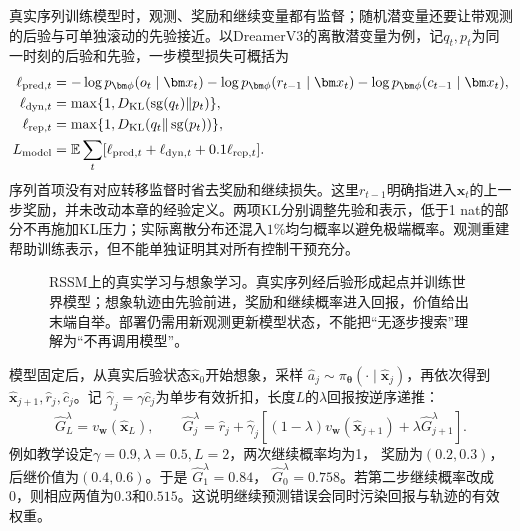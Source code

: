 真实序列训练模型时，观测、奖励和继续变量都有监督；随机潜变量还要让带观测的后验与可单独滚动的先验接近。以DreamerV3的离散潜变量为例，记$q_t,p_t$为同一时刻的后验和先验，一步模型损失可概括为
\begin{align}
 \ell_{\mathrm{pred},t}
   &=-\log p_{\bm\phi}(o_t\mid\bm x_t)
     -\log p_{\bm\phi}(r_{t-1}\mid\bm x_t)
     -\log p_{\bm\phi}(c_{t-1}\mid\bm x_t),\notag\\
 \ell_{\mathrm{dyn},t}
   &=\max\{1,D_{\mathrm{KL}}(\operatorname{sg}(q_t)\|p_t)\},\notag\\
 \ell_{\mathrm{rep},t}
   &=\max\{1,D_{\mathrm{KL}}(q_t\|\operatorname{sg}(p_t))\},\notag\\
 L_{\mathrm{model}}&=\mathbb E\sum_t
       [\ell_{\mathrm{pred},t}+\ell_{\mathrm{dyn},t}
                         +0.1\ell_{\mathrm{rep},t}].
 \label{eq:rl-learning-dreamer-model}
\end{align}
序列首项没有对应转移监督时省去奖励和继续损失。这里$r_{t-1}$明确指进入$\bm x_t$的上一步奖励，并未改动本章的经验定义。两项KL分别调整先验和表示，低于1 nat的部分不再施加KL压力；实际离散分布还混入$1\%$均匀概率以避免极端概率。观测重建帮助训练表示，但不能单独证明其对所有控制干预充分。

\begin{figure}[t]
  \centering
  
  \caption{RSSM上的真实学习与想象学习。真实序列经后验形成起点并训练世界模型；想象轨迹由先验前进，奖励和继续概率进入回报，价值给出末端自举。部署仍需用新观测更新模型状态，不能把“无逐步搜索”理解为“不再调用模型”。}
  \label{fig:rl-learning-dreamer}
\end{figure}

模型固定后，从真实后验状态$\widehat{\bm x}_0$开始想象，采样
$\widehat a_j\sim\pi_{\bm\theta}(\cdot\mid\widehat{\bm x}_j)$，再依次得到
$\widehat{\bm x}_{j+1},\widehat r_j,\widehat c_j$。记
$\widehat\gamma_j=\gamma\widehat c_j$为单步有效折扣，长度$L$的$\lambda$回报按逆序递推：
\begin{equation}
 \widehat G_L^\lambda=v_{\bm w}(\widehat{\bm x}_L),\qquad
 \widehat G_j^\lambda
  =\widehat r_j+\widehat\gamma_j
     [(1-\lambda)v_{\bm w}(\widehat{\bm x}_{j+1})
                              +\lambda\widehat G_{j+1}^\lambda].
 \label{eq:rl-learning-dreamer-return}
\end{equation}
例如教学设定$\gamma=0.9,\lambda=0.5,L=2$，两次继续概率均为1，
奖励为$(0.2,0.3)$，后继价值为$(0.4,0.6)$。于是
$\widehat G_1^\lambda=0.84$，
$\widehat G_0^\lambda=0.758$。若第二步继续概率改成0，则相应两值为$0.3$和$0.515$。这说明继续预测错误会同时污染回报与轨迹的有效权重。

